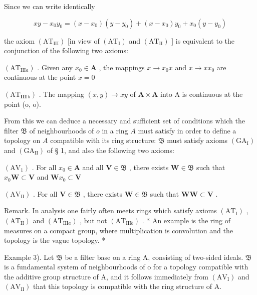 Since we can write identically

\[
x y - x _ {0} y _ {0} = (x - x _ {0}) (y - y _ {0}) + (x - x _ {0}) y _ {0} + x _ {0} (y - y _ {0})
\]

the axiom \((\mathrm{AT}_{\mathrm{III}})\) {[}in view of \((\mathrm{AT}_{\mathrm{I}})\) and \((\mathrm{AT}_{\mathrm{II}})\) {]} is equivalent to the conjunction of the following two axioms:

\((\mathrm{AT}_{\mathrm{III}a})\) . Given any \(x_0\in \mathbf{A}\) , the mappings \(x\to x_0x\) and \(x\rightarrow xx_0\) are continuous at the point \(x = 0\)

\((\mathrm{AT}_{\mathbf{III}\ b})\) . The mapping \((x,y)\rightarrow xy\) of \(\mathbf{A}\times \mathbf{A}\) into A is continuous at the point (o, o).

From this we can deduce a necessary and sufficient set of conditions which the filter \(\mathfrak{B}\) of neighbourhoods of \(o\) in a ring \(A\) must satisfy in order to define a topology on \(A\) compatible with its ring structure: \(\mathfrak{B}\) must satisfy axioms \((\mathrm{GA}_{\mathrm{I}})\) and \((\mathrm{GA}_{\mathrm{II}})\) of § 1, and also the following two axioms:

\((\mathrm{AV}_{1})\) . For all \(x_0\in \mathbf{A}\) and all \(\mathbf{V}\in \mathfrak{B}\) , there exists \(\mathbf{W}\in \mathfrak{B}\) such that \(x_0\mathbf{W}\subset \mathbf{V}\) and \(\mathbf{W}x_0\subset \mathbf{V}\)

\((\mathrm{AV}_{\mathrm{II}})\) . For all \(\mathbf{V} \in \mathfrak{B}\) , there exists \(\mathbf{W} \in \mathfrak{B}\) such that \(\mathbf{WW} \subset \mathbf{V}\) .

Remark. In analysis one fairly often meets rings which satisfy axioms \((\mathrm{AT}_{\mathrm{I}})\) , \((\mathrm{AT}_{\mathrm{II}})\) and \((\mathrm{AT}_{\mathrm{III}a})\) , but not \((\mathrm{AT}_{\mathrm{III}b})\) . * An example is the ring of measures on a compact group, where multiplication is convolution and the topology is the vague topology. *

Example 3). Let \(\mathfrak{B}\) be a filter base on a ring A, consisting of two-sided ideals. \(\mathfrak{B}\) is a fundamental system of neighbourhoods of o for a topology compatible with the additive group structure of A, and it follows immediately from \((\mathrm{AV}_{\mathrm{I}})\) and \((\mathrm{AV}_{\mathrm{II}})\) that this topology is compatible with the ring structure of A.

